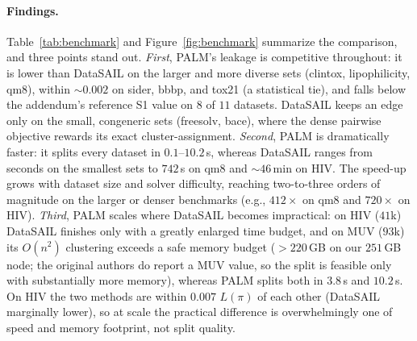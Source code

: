 \documentclass{article}
\begin{document}
\paragraph{Findings.} Table~\ref{tab:benchmark} and Figure~\ref{fig:benchmark}
summarize the comparison, and three points stand out. \emph{First}, PALM's
leakage is competitive throughout: it is lower than DataSAIL on the larger and
more diverse sets (clintox, lipophilicity, qm8), within $\sim$$0.002$ on sider,
bbbp, and tox21 (a statistical tie), and falls below the addendum's reference S1
value on $8$ of $11$ datasets. DataSAIL keeps an edge only on the small, congeneric
sets (freesolv, bace), where the dense pairwise objective rewards its exact
cluster-assignment. \emph{Second}, PALM is
dramatically faster: it splits every dataset in $0.1$--$10.2$\,s, whereas
DataSAIL ranges from seconds on the smallest sets to $742$\,s on qm8 and
$\sim$$46$\,min on HIV. The speed-up grows with dataset size and solver
difficulty, reaching two-to-three orders of magnitude on the larger or denser
benchmarks (e.g., $412\times$ on qm8 and $720\times$ on HIV). \emph{Third}, PALM scales where
DataSAIL becomes impractical: on HIV ($41$k) DataSAIL finishes only with a
greatly enlarged time budget, and on MUV ($93$k) its $O(n^2)$ clustering exceeds
a safe memory budget ($>220$\,GB on our $251$\,GB node; the original authors do
report a MUV value, so the split is feasible only with substantially more
memory), whereas PALM splits both in $3.8$\,s and $10.2$\,s. On HIV the two
methods are within $0.007$ $L(\pi)$ of each other (DataSAIL marginally lower), so
at scale the practical difference is overwhelmingly one of speed and memory
footprint, not split quality.
\end{document}

